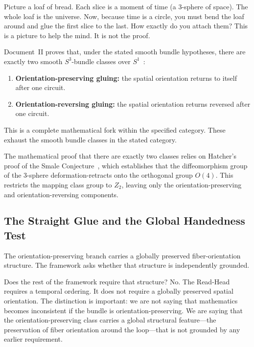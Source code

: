 \documentclass[11pt]{article}
\theoremstyle{canonstyle}
\def\mathbb#1{#1}%
\begin{document}
Picture a loaf of bread. Each slice is a moment of time (a 3-sphere of space). The whole loaf is the universe. Now, because time is a circle, you must bend the loaf around and glue the first slice to the last. How exactly do you attach them? This is a picture to help the mind. It is not the proof.

Document~II proves that, under the stated smooth bundle hypotheses, there are exactly two smooth $S^3$-bundle classes over $S^1$~\cite{CanonWhat}:
\begin{enumerate}
    \item \textbf{Orientation-preserving gluing:} the spatial orientation returns to itself after one circuit.
    \item \textbf{Orientation-reversing gluing:} the spatial orientation returns reversed after one circuit.
\end{enumerate}

This is a complete mathematical fork within the specified category. These exhaust the smooth bundle classes in the stated category.

\begin{forthecurious}
The mathematical proof that there are exactly two classes relies on Hatcher's proof of the Smale Conjecture~\cite{Hatcher}, which establishes that the diffeomorphism group of the 3-sphere deformation-retracts onto the orthogonal group $O(4)$. This restricts the mapping class group to $\mathbb{Z}_2$, leaving only the orientation-preserving and orientation-reversing components.
\end{forthecurious}

\subsection{The Straight Glue and the Global Handedness Test}

The orientation-preserving branch carries a globally preserved fiber-orientation structure. The framework asks whether that structure is independently grounded.

Does the rest of the framework require that structure? No. The Read-Head requires a temporal ordering. It does not require a globally preserved spatial orientation. The distinction is important: we are not saying that mathematics becomes inconsistent if the bundle is orientation-preserving. We are saying that the orientation-preserving class carries a global structural feature---the preservation of fiber orientation around the loop---that is not grounded by any earlier requirement.
\end{document}
